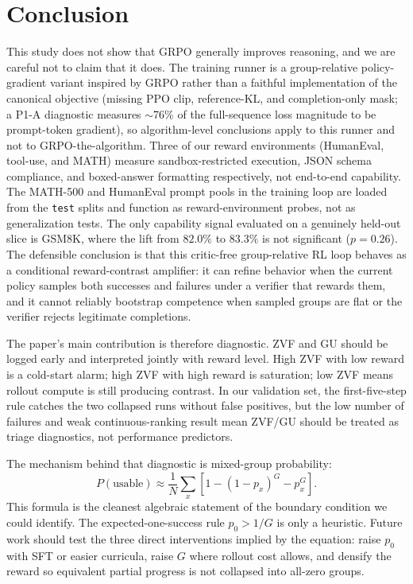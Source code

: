 \section{Conclusion}
\label{sec:conclusion}

This study does not show that GRPO generally improves reasoning, and we are
careful not to claim that it does.  The training runner is a group-relative
policy-gradient variant inspired by GRPO rather than a faithful implementation
of the canonical objective (missing PPO clip, reference-KL, and completion-only
mask; a P1-A diagnostic measures $\sim$76\% of the full-sequence loss magnitude
to be prompt-token gradient), so algorithm-level conclusions apply to this
runner and not to GRPO-the-algorithm.  Three of our reward environments
(HumanEval, tool-use, and MATH) measure sandbox-restricted execution, JSON
schema compliance, and boxed-answer formatting respectively, not end-to-end
capability.  The MATH-500 and HumanEval prompt pools in the training loop are
loaded from the \texttt{test} splits and function as reward-environment
probes, not as generalization tests.  The only capability signal evaluated on
a genuinely held-out slice is GSM8K, where the lift from $82.0\%$ to
$83.3\%$ is not significant ($p=0.26$).  The defensible conclusion is that
this critic-free group-relative RL loop behaves as a conditional reward-contrast
amplifier: it can refine behavior when the current policy samples both
successes and failures under a verifier that rewards them, and it cannot
reliably bootstrap competence when sampled groups are flat or the verifier
rejects legitimate completions.

The paper's main contribution is therefore diagnostic.  ZVF and GU should be
logged early and interpreted jointly with reward level.  High ZVF with low
reward is a cold-start alarm; high ZVF with high reward is saturation; low ZVF
means rollout compute is still producing contrast.  In our validation set,
the first-five-step rule catches the two collapsed runs without false
positives, but the low number of failures and weak continuous-ranking result
mean ZVF/GU should be treated as triage diagnostics, not performance
predictors.

The mechanism behind that diagnostic is mixed-group probability:
\[
P(\text{usable}) \approx \frac{1}{N}\sum_x \left[1 - (1-p_x)^G - p_x^G\right].
\]
This formula is the cleanest algebraic statement of the boundary condition we
could identify.  The
expected-one-success rule $p_0>1/G$ is only a heuristic.  Future work should
test the three direct interventions implied by the equation: raise $p_0$ with
SFT or easier curricula, raise $G$ where rollout cost allows, and densify the
reward so equivalent partial progress is not collapsed into all-zero groups.

